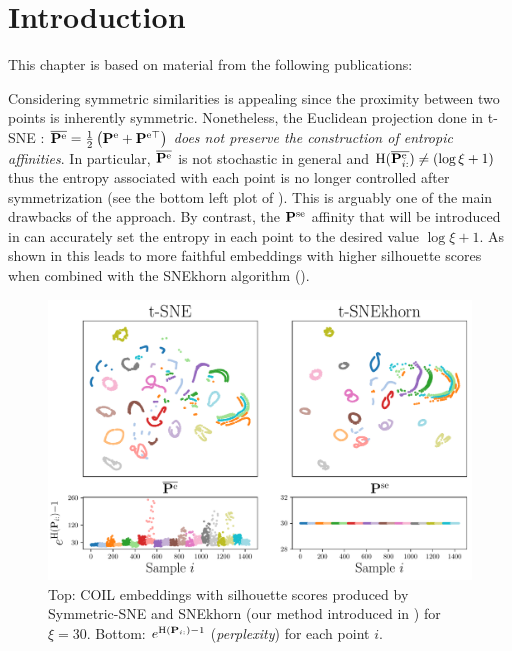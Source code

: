 
\section{Introduction}

This chapter is based on material from the following publications:

\begin{mdframed}
\begin{center} 
\end{center}
\end{mdframed}

\begin{mdframed}
    \begin{center} 
    \end{center}
\end{mdframed}

Considering symmetric similarities is appealing since the proximity between two
points is inherently symmetric. Nonetheless, the Euclidean projection done in t-SNE : $\overline{\mathbf{P}^{\mathrm{e}}} = \frac{1}{2} \left( \mathbf{P}^{\mathrm{e}} + \mathbf{P}^{\mathrm{e} \top} \right)$ \emph{does not preserve the construction of entropic
affinities}.  In particular, $\overline{\mathbf{P}^{\mathrm{e}}}$ is not stochastic in
general and $\operatorname{H}(\overline{\mathbf{P}_{i:}^{\mathrm{e}}}) \neq (\log{\xi} + 1)$ thus the entropy associated with each point is no longer controlled after symmetrization (see the bottom left plot of ). This is
arguably one of the main drawbacks of the approach. By contrast, the
$\mathbf{P}^{\mathrm{se}}$ affinity that will be introduced in  can
accurately set the entropy in each point to the desired value $\log \xi + 1$.  As shown in  this leads to more faithful embeddings with higher silhouette scores when combined with the SNEkhorn algorithm ().

\begin{figure}
    \centering
    \includegraphics[width=0.6\linewidth]{figures/SNEkhorn/fig_coil.pdf}
    \caption{Top: COIL \cite{nene1996columbia} embeddings with silhouette scores produced by Symmetric-SNE and SNEkhorn (our method introduced in  ) for $\xi=30$. Bottom: $e^{\operatorname{H}(\mathbf{P}_{i:})-1}$ (\emph{perplexity}) for each point $i$.}
    \label{fig:coil}
\end{figure}

